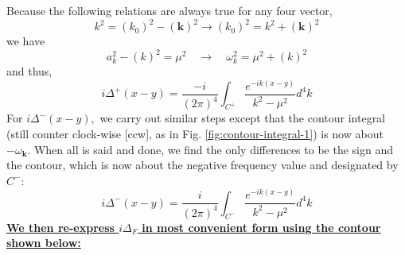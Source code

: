 Because the following relations are always true for any four vector,
\begin{equation}
k^{2}=\left(k_{0}\right)^{2}-(\mathbf{k})^{2} \rightarrow\left(k_{0}\right)^{2}=k^{2}+(\mathbf{k})^{2}
\end{equation}
we have
\begin{equation}
a_{k}^{2}-(k)^{2}=\mu^{2} \quad \rightarrow \quad \omega_{k}^{2}=\mu^{2}+(k)^{2}
\end{equation}
and thus,
\begin{equation}
i \Delta^{+}(x-y)=\frac{-i}{(2 \pi)^{4}} \int_{C^{+}} \frac{e^{-i k(x-y)}}{k^{2}-\mu^{2}} d^{4} k
\end{equation}
For $i \Delta^{-}(x-y),$ we carry out similar steps except that the contour integral (still counter clock-wise [ccw], as in Fig. \ref{fig:contour-integral-1}) is now about $-\omega_{\mathbf{k}} .$ When all is said and done, we find the only differences to be the sign and the contour, which is now about the negative frequency value and designated by $C^-$:
\begin{equation}
i \Delta^{-}(x-y)=\frac{i}{(2 \pi)^{4}} \int_{C^{-}} \frac{e^{-i k(x-y)}}{k^{2}-\mu^{2}} d^{4} k
\end{equation}
\underline{\textbf{We then re-express $i\Delta_F$ in most convenient form using the contour shown below:}}
